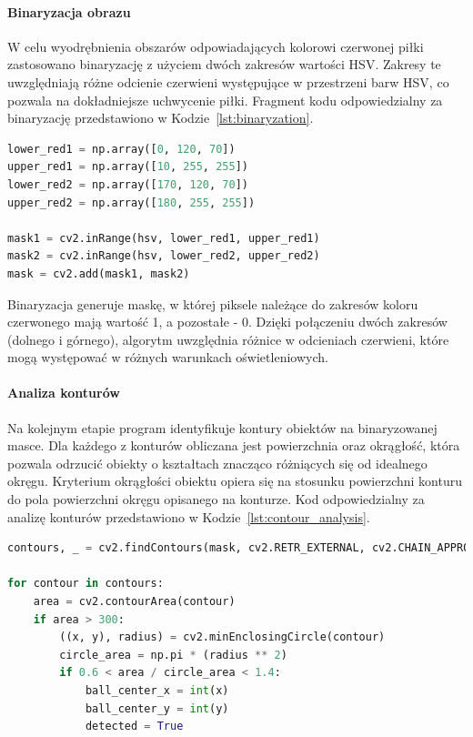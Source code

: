 \documentclass[a4paper,twoside,12pt]{book}
\begin{document}
\paragraph{Binaryzacja obrazu}
W celu wyodrębnienia obszarów odpowiadających kolorowi czerwonej piłki zastosowano binaryzację z użyciem dwóch zakresów wartości HSV. Zakresy te uwzględniają różne odcienie czerwieni występujące w przestrzeni barw HSV, co pozwala na dokładniejsze uchwycenie piłki. Fragment kodu odpowiedzialny za binaryzację przedstawiono w Kodzie~\ref{lst:binaryzation}.

\begin{lstlisting}[language=Python, caption={Binaryzacja obrazu w oparciu o zakresy HSV.}, label={lst:binaryzation}, captionpos=b]
lower_red1 = np.array([0, 120, 70])
upper_red1 = np.array([10, 255, 255])
lower_red2 = np.array([170, 120, 70])
upper_red2 = np.array([180, 255, 255])

mask1 = cv2.inRange(hsv, lower_red1, upper_red1)
mask2 = cv2.inRange(hsv, lower_red2, upper_red2)
mask = cv2.add(mask1, mask2)
\end{lstlisting}

Binaryzacja generuje maskę, w której piksele należące do zakresów koloru czerwonego mają wartość 1, a pozostałe - 0. Dzięki połączeniu dwóch zakresów (dolnego i górnego), algorytm uwzględnia różnice w odcieniach czerwieni, które mogą występować w różnych warunkach oświetleniowych.

\paragraph{Analiza konturów}
Na kolejnym etapie program identyfikuje kontury obiektów na binaryzowanej masce. Dla każdego z konturów obliczana jest powierzchnia oraz okrągłość, która pozwala odrzucić obiekty o kształtach znacząco różniących się od idealnego okręgu. Kryterium okrągłości obiektu opiera się na stosunku powierzchni konturu do pola powierzchni okręgu opisanego na konturze. Kod odpowiedzialny za analizę konturów przedstawiono w Kodzie~\ref{lst:contour_analysis}.

\begin{lstlisting}[language=Python, caption={Analiza konturów w celu identyfikacji piłki.}, label={lst:contour_analysis}, captionpos=b]
contours, _ = cv2.findContours(mask, cv2.RETR_EXTERNAL, cv2.CHAIN_APPROX_SIMPLE)

for contour in contours:
    area = cv2.contourArea(contour)
    if area > 300:
        ((x, y), radius) = cv2.minEnclosingCircle(contour)
        circle_area = np.pi * (radius ** 2)
        if 0.6 < area / circle_area < 1.4:
            ball_center_x = int(x)
            ball_center_y = int(y)
            detected = True
\end{lstlisting}
\end{document}
